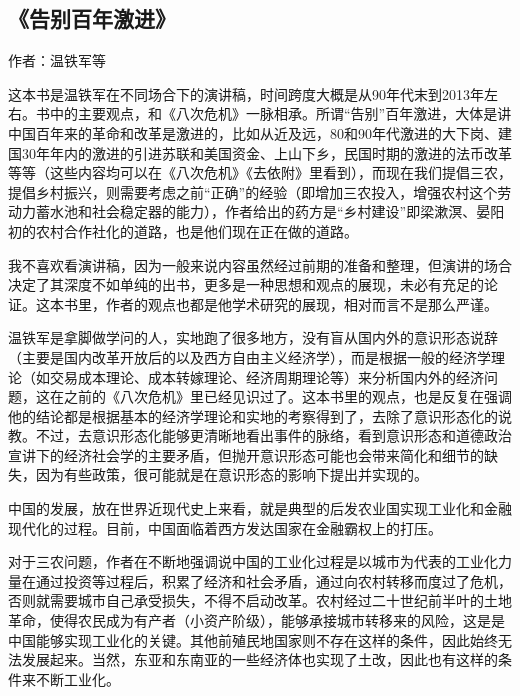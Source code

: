 \subsection{《告别百年激进》}

作者：温铁军等

这本书是温铁军在不同场合下的演讲稿，时间跨度大概是从90年代末到2013年左右。书中的主要观点，和《八次危机》一脉相承。所谓“告别”百年激进，大体是讲中国百年来的革命和改革是激进的，比如从近及远，80和90年代激进的大下岗、建国30年年内的激进的引进苏联和美国资金、上山下乡，民国时期的激进的法币改革等等（这些内容均可以在《八次危机》《去依附》里看到），而现在我们提倡三农，提倡乡村振兴，则需要考虑之前“正确”的经验（即增加三农投入，增强农村这个劳动力蓄水池和社会稳定器的能力），作者给出的药方是“乡村建设”即梁漱溟、晏阳初的农村合作社化的道路，也是他们现在正在做的道路。

我不喜欢看演讲稿，因为一般来说内容虽然经过前期的准备和整理，但演讲的场合决定了其深度不如单纯的出书，更多是一种思想和观点的展现，未必有充足的论证。这本书里，作者的观点也都是他学术研究的展现，相对而言不是那么严谨。

温铁军是拿脚做学问的人，实地跑了很多地方，没有盲从国内外的意识形态说辞（主要是国内改革开放后的以及西方自由主义经济学），而是根据一般的经济学理论（如交易成本理论、成本转嫁理论、经济周期理论等）来分析国内外的经济问题，这在之前的《八次危机》里已经见识过了。这本书里的观点，也是反复在强调他的结论都是根据基本的经济学理论和实地的考察得到了，去除了意识形态化的说教。不过，去意识形态化能够更清晰地看出事件的脉络，看到意识形态和道德政治宣讲下的经济社会学的主要矛盾，但抛开意识形态可能也会带来简化和细节的缺失，因为有些政策，很可能就是在意识形态的影响下提出并实现的。

中国的发展，放在世界近现代史上来看，就是典型的后发农业国实现工业化和金融现代化的过程。目前，中国面临着西方发达国家在金融霸权上的打压。

对于三农问题，作者在不断地强调说中国的工业化过程是以城市为代表的工业化力量在通过投资等过程后，积累了经济和社会矛盾，通过向农村转移而度过了危机，否则就需要城市自己承受损失，不得不启动改革。农村经过二十世纪前半叶的土地革命，使得农民成为有产者（小资产阶级），能够承接城市转移来的风险，这是是中国能够实现工业化的关键。其他前殖民地国家则不存在这样的条件，因此始终无法发展起来。当然，东亚和东南亚的一些经济体也实现了土改，因此也有这样的条件来不断工业化。

